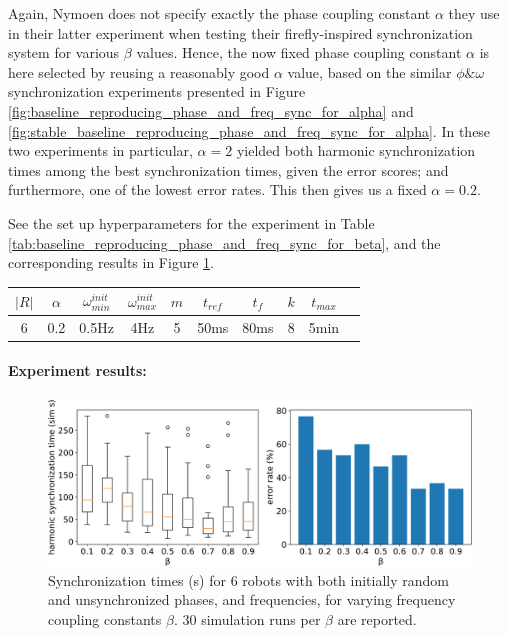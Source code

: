 		Again, Nymoen does not specify exactly the phase coupling constant $\alpha$ they use in their latter experiment when testing their firefly-inspired synchronization system for various $\beta$ values. Hence, the now fixed phase coupling constant $\alpha$ is here selected by reusing a reasonably good $\alpha$ value, based on the similar $\phi\&\omega$ synchronization experiments presented in Figure \ref{fig:baseline_reproducing_phase_and_freq_sync_for_alpha} and \ref{fig:stable_baseline_reproducing_phase_and_freq_sync_for_alpha}. In these two experiments in particular, $\alpha=2$ yielded both harmonic synchronization times among the best synchronization times, given the error scores; and furthermore, one of the lowest error rates. This then gives us a fixed $\alpha = 0.2$.
		
		See the set up hyperparameters for the experiment in Table \ref{tab:baseline_reproducing_phase_and_freq_sync_for_beta}, and the corresponding results in Figure \ref{fig:baseline_reproducing_phase_and_freq_sync_for_beta}.
		
		\begin{center}
		\begin{tabular}{ |c|c|c|c|c|c|c|c|c|c| } 
		\hline
		$|R|$ & $\alpha$ & $\omega_{min}^{init}$ & $\omega_{max}^{init}$ & $m$ & $t_{ref}$ & $t_f$ & $k$ & $t_{max}$ \\
		\hline
		6 & 0.2 & 0.5Hz & 4Hz & 5 & 50ms & 80ms & 8 & 5min \\
		\hline
		\end{tabular}
		\label{tab:baseline_reproducing_phase_and_freq_sync_for_beta}
		\end{center}
		
		\paragraph{Experiment results:\nl}
		
		\begin{figure}[ht!]
			\centering
			\includegraphics[width=\linewidth]{Assets/DocSegments/Chapters/ExperimentsAndResults/Figures/PerfScores/baseline_reproducing_phase_and_freq_sync_for_beta.pdf}
			\caption[Experiment results for second $\phi$ \& $\omega$ synchronization baseline reproduction experiment.]{Synchronization times (s) for 6 robots with both initially random and unsynchronized phases, and frequencies, for varying frequency coupling constants $\beta$. 30 simulation runs per $\beta$ are reported.}
			\label{fig:baseline_reproducing_phase_and_freq_sync_for_beta}
		\end{figure}
		
